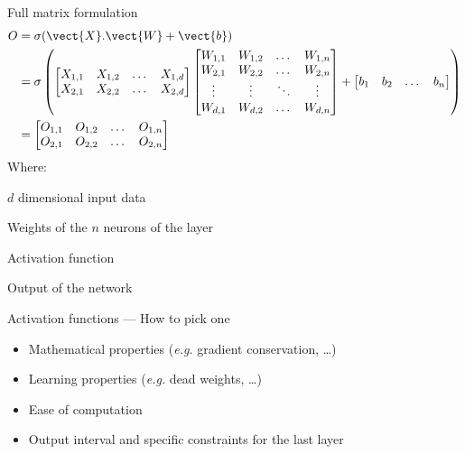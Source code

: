 \begin{frame}{Full matrix formulation}
  \footnotesize
  \begin{align*}
    O & = \sigma (\vect{X}.\vect{W} + \vect{b}) \\
    & = \sigma \left(
    \begin{bmatrix}
      X_{1,1} & X_{1,2} & \dots & X_{1,d} \\
      X_{2,1} & X_{2,2} & \dots & X_{2,d}
    \end{bmatrix}
    \begin{bmatrix}
      W_{1,1} & W_{1,2} & \dots  & W_{1,n} \\
      W_{2,1} & W_{2,2} & \dots  & W_{2,n} \\
      \vdots & \vdots & \ddots & \vdots \\
      W_{d,1} & W_{d,2} & \dots  & W_{d,n}
    \end{bmatrix}
    +
    \begin{bmatrix}
      b_1 & b_2 & \dots & b_n
    \end{bmatrix}
    \right) \\
    & = \begin{bmatrix}
      O_{1,1} & O_{1,2} & \dots & O_{1,n} \\
      O_{2,1} & O_{2,2} & \dots & O_{2,n}
    \end{bmatrix}
  \end{align*}
  Where:
  \begin{description}[<+->]
    \item[$\vect{X}$] $d$ dimensional input data
    \item[$\vect{W}$ \& $\vect{b}$] Weights of the $n$ neurons of the layer
    \item[$\bm{\sigma}$] Activation function
    \item[$\vect{O}$] Output of the network
  \end{description}
\end{frame}

\begin{frame}{Activation functions --- How to pick one}
  \begin{itemize}[<+->]
    \item Mathematical properties (\emph{e.g.} gradient conservation, …)
    \item Learning properties (\emph{e.g.} dead weights, …)
    \item Ease of computation
    \item Output interval and specific constraints for the last layer
  \end{itemize}
\end{frame}

